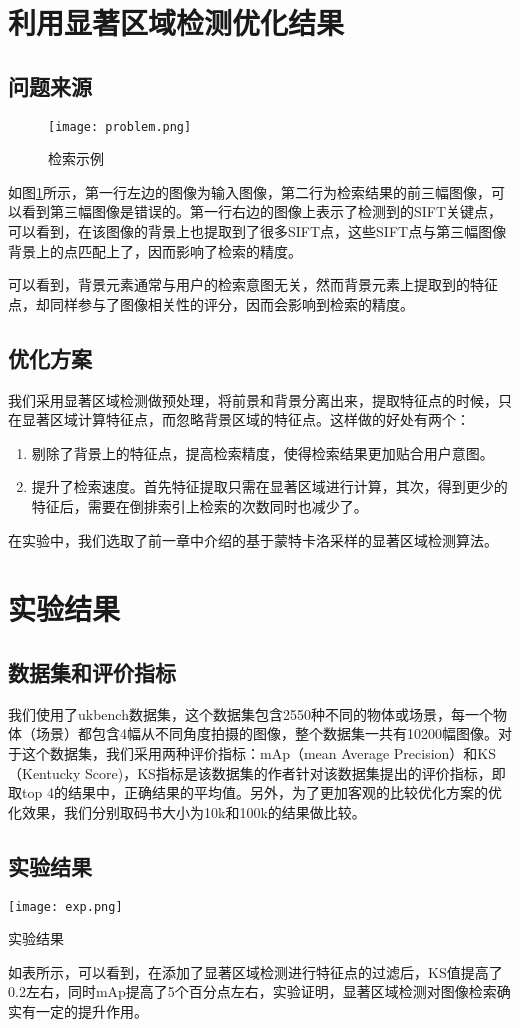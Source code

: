 \section{利用显著区域检测优化结果}
\subsection{问题来源}
\begin{figure}[h]
\centering
\texttt{[image: problem.png]}
\caption{检索示例}\label{fig:problem}
\end{figure}
如图\ref{fig:problem}所示，第一行左边的图像为输入图像，第二行为检索结果的前三幅图像，可以看到第三幅图像是错误的。第一行右边的图像上表示了检测到的SIFT关键点，可以看到，在该图像的背景上也提取到了很多SIFT点，这些SIFT点与第三幅图像背景上的点匹配上了，因而影响了检索的精度。

可以看到，背景元素通常与用户的检索意图无关，然而背景元素上提取到的特征点，却同样参与了图像相关性的评分，因而会影响到检索的精度。

\subsection{优化方案}
我们采用显著区域检测做预处理，将前景和背景分离出来，提取特征点的时候，只在显著区域计算特征点，而忽略背景区域的特征点。这样做的好处有两个：
\begin{enumerate}
\item 剔除了背景上的特征点，提高检索精度，使得检索结果更加贴合用户意图。
\item 提升了检索速度。首先特征提取只需在显著区域进行计算，其次，得到更少的特征后，需要在倒排索引上检索的次数同时也减少了。
\end{enumerate}
在实验中，我们选取了前一章中介绍的基于蒙特卡洛采样的显著区域检测算法。

\section{实验结果}
\subsection{数据集和评价指标}
我们使用了ukbench数据集\cite{nister2006scalable}，这个数据集包含2550种不同的物体或场景，每一个物体（场景）都包含4幅从不同角度拍摄的图像，整个数据集一共有10200幅图像。对于这个数据集，我们采用两种评价指标：mAp（mean Average Precision）和KS（Kentucky Score)，KS指标是该数据集的作者针对该数据集提出的评价指标，即取top 4的结果中，正确结果的平均值。另外，为了更加客观的比较优化方案的优化效果，我们分别取码书大小为10k和100k的结果做比较。
\subsection{实验结果}
\begin{table}
\centering
\texttt{[image: exp.png]}
\caption{实验结果}
\end{table}
如表所示，可以看到，在添加了显著区域检测进行特征点的过滤后，KS值提高了0.2左右，同时mAp提高了5个百分点左右，实验证明，显著区域检测对图像检索确实有一定的提升作用。
